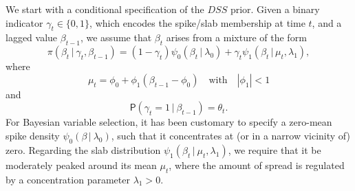 \documentclass[ba]{imsart}
\numberwithin{equation}{section}
\theoremstyle{plain}
\renewcommand{\P}{\mathsf{P}}
\def\C {\,|\:}
\def\C {\,|\:}
\newcommand{\e}{\mathrm{e}}
\begin{document}
We start with a conditional specification of the $DSS$ prior. Given a binary indicator $\gamma_t\in\{0,1\}$, which encodes the spike/slab membership at time $t$, and a lagged value $\beta_{t-1}$, we assume that $\beta_t$  arises from a mixture of the form
\begin{equation}\label{betas}
\pi(\beta_{t}\C\gamma_{t},\beta_{t-1})=(1-\gamma_{t})\psi_0(\beta_{t}\C\lambda_0)+\gamma_{t}\psi_1\left(\beta_{t}\,|\,\mu_t,\lambda_1\right),
\end{equation}
where
\begin{equation}\label{mu}
\mu_t=\phi_{0}+\phi_{1}(\beta_{t-1}-\phi_0)\quad\text{with}\quad |\phi_1|<1
\end{equation}
and
\begin{equation}\label{gammas}
\P(\gamma_{t}=1\C\beta_{t-1})=\theta_t.
\end{equation}
For Bayesian variable selection, it has been customary to specify a zero-mean spike density $\psi_0(\beta\C\lambda_0)$, such that it concentrates at (or in a narrow vicinity of) zero.
Regarding the slab distribution $\psi_1(\beta_{t}\C\mu_t,\lambda_1)$, we require that it be moderately peaked around its mean $\mu_t$, where the amount of spread is regulated by a concentration parameter $\lambda_1>0$.  
\end{document}
